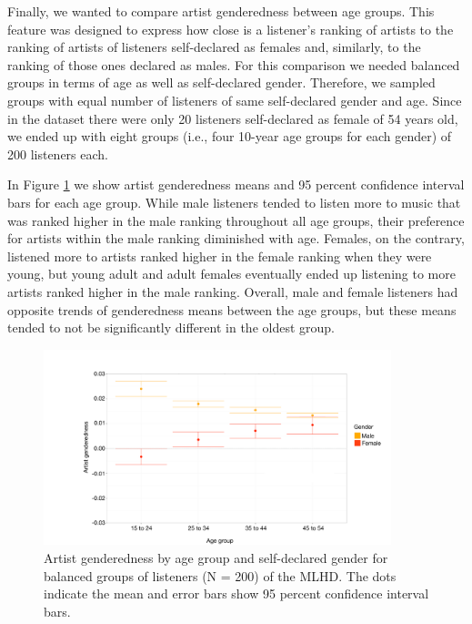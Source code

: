 Finally, we wanted to compare artist genderedness between age groups. This feature was designed to express how close is a listener's ranking of artists to the ranking of artists of listeners self-declared as females and, similarly, to the ranking of those ones declared as males. 
For this comparison we needed balanced groups in terms of age as well as self-declared gender. Therefore, we sampled groups with equal number of listeners of same self-declared gender and age. Since in the dataset there were only 20 listeners self-declared as female of 54 years old, we ended up with eight groups (i.e., four 10-year age groups for each gender) of 200 listeners each.

In Figure \ref{fig:artist_genderedness_by_age_groups_cropped} we show artist genderedness means and 95 percent confidence interval bars for each age group.
While male listeners tended to listen more to music that was ranked higher in the male ranking throughout all age groups, their preference for artists within the male ranking diminished with age. 
Females, on the contrary, listened more to artists ranked higher in the female ranking when they were young, but young adult and adult females eventually ended up listening to more artists ranked higher in the male ranking. Overall, male and female listeners had opposite trends of genderedness means between the age groups, but these means tended to not be significantly different in the oldest group.

\graphicspath{{./figs/ch6/}}
\begin{figure}[!th]
\vspace{1em}
\centering
\includegraphics[width=0.9\textwidth]{artist_genderedness_by_age_groups_cropped.pdf}
\caption[Artist genderedness by age group and self-declared gender for balanced groups of listeners]{Artist genderedness by age group and self-declared gender for balanced groups of listeners (N = 200) of the MLHD. The dots indicate the mean and error bars show 95 percent confidence interval bars.}
\label{fig:artist_genderedness_by_age_groups_cropped}
\end{figure}




